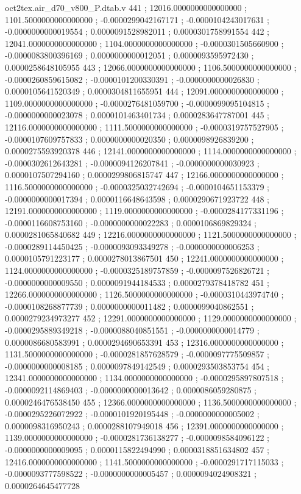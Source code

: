 \begin{filecontents}[overwrite]{oct2tex.air_d70_v800_P.dtab.v}
441 ; 12016.0000000000000000 ; 1101.5000000000000000 ; -0.0000299042167171 ; -0.0000104243017631 ; -0.0000000000019554 ; 0.0000091528982011 ; 0.0000301758991554
442 ; 12041.0000000000000000 ; 1104.0000000000000000 ; -0.0000301505660900 ; -0.0000083800396169 ; 0.0000000000012051 ; 0.0000093595972430 ; 0.0000258648105955
443 ; 12066.0000000000000000 ; 1106.5000000000000000 ; -0.0000260859615082 ; -0.0000101200330391 ; -0.0000000000026830 ; 0.0000105641520349 ; 0.0000304811655951
444 ; 12091.0000000000000000 ; 1109.0000000000000000 ; -0.0000276481059700 ; -0.0000099095104815 ; -0.0000000000023078 ; 0.0000101463401734 ; 0.0000283647787001
445 ; 12116.0000000000000000 ; 1111.5000000000000000 ; -0.0000319757527905 ; -0.0000107609757833 ; 0.0000000000020350 ; 0.0000098926839200 ; 0.0000275593920378
446 ; 12141.0000000000000000 ; 1114.0000000000000000 ; -0.0000302612643281 ; -0.0000094126207841 ; -0.0000000000030923 ; 0.0000107507294160 ; 0.0000299806815747
447 ; 12166.0000000000000000 ; 1116.5000000000000000 ; -0.0000325032742694 ; -0.0000104651153379 ; -0.0000000000017394 ; 0.0000116648643598 ; 0.0000290671923722
448 ; 12191.0000000000000000 ; 1119.0000000000000000 ; -0.0000284177331196 ; -0.0000116608753160 ; -0.0000000000022283 ; 0.0000106869829324 ; 0.0000281065840682
449 ; 12216.0000000000000000 ; 1121.5000000000000000 ; -0.0000289114450425 ; -0.0000093093349278 ; -0.0000000000006253 ; 0.0000105791223177 ; 0.0000278013867501
450 ; 12241.0000000000000000 ; 1124.0000000000000000 ; -0.0000325189757859 ; -0.0000097526826721 ; -0.0000000000009550 ; 0.0000091944184533 ; 0.0000279378418782
451 ; 12266.0000000000000000 ; 1126.5000000000000000 ; -0.0000310443974740 ; -0.0000108268877739 ; 0.0000000000011482 ; 0.0000099040862551 ; 0.0000279234973277
452 ; 12291.0000000000000000 ; 1129.0000000000000000 ; -0.0000295889349218 ; -0.0000088040851551 ; -0.0000000000014779 ; 0.0000086680583991 ; 0.0000294690653391
453 ; 12316.0000000000000000 ; 1131.5000000000000000 ; -0.0000281857628579 ; -0.0000097775509857 ; -0.0000000000008185 ; 0.0000097849142549 ; 0.0000293503853754
454 ; 12341.0000000000000000 ; 1134.0000000000000000 ; -0.0000295897807518 ; -0.0000092114869403 ; -0.0000000000013642 ; 0.0000086059280875 ; 0.0000246476538450
455 ; 12366.0000000000000000 ; 1136.5000000000000000 ; -0.0000295226072922 ; -0.0000101920195448 ; -0.0000000000005002 ; 0.0000098316950243 ; 0.0000288107949018
456 ; 12391.0000000000000000 ; 1139.0000000000000000 ; -0.0000281736138277 ; -0.0000098584096122 ; -0.0000000000009095 ; 0.0000115822494990 ; 0.0000318851634802
457 ; 12416.0000000000000000 ; 1141.5000000000000000 ; -0.0000291717115033 ; -0.0000093777598522 ; -0.0000000000005457 ; 0.0000094024908321 ; 0.0000264645477728

\end{filecontents}
